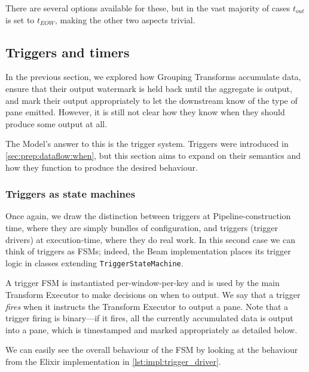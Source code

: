 There are several options available for these, but in the vast majority of cases $t_{\mathit{out}}$ is set to $t_{\mathit{EOW}}$, making the other two aspects trivial.

\subsection{Triggers and timers}\label{sec:impl:dataflow:triggers-timers}

In the previous section, we explored how Grouping Transforms accumulate data, ensure that their output watermark is held back until the aggregate is output, and mark their output appropriately to let the downstream know of the type of pane emitted.
However, it is still not clear how they know when they should produce some output at all.

The Model's answer to this is the trigger system.
Triggers were introduced in \cref{sec:prep:dataflow:when}, but this section aims to expand on their semantics and how they function to produce the desired behaviour.


\subsubsection{Triggers as state machines}
Once again, we draw the distinction between triggers at Pipeline-construction time, where they are simply bundles of configuration, and triggers (trigger drivers) at execution-time, where they do real work.
In this second case we can think of triggers as FSMs; indeed, the Beam implementation places its trigger logic in classes extending \verb|TriggerStateMachine|.

A trigger FSM is instantiated per-window-per-key and is used by the main Transform Executor to make decisions on when to output.
We say that a trigger \emph{fires} when it instructs the Transform Executor to output a pane.
Note that a trigger firing is binary---if it fires, all the currently accumulated data is output into a pane, which is timestamped and marked appropriately as detailed below.

We can easily see the overall behaviour of the FSM by looking at the  behaviour from the Elixir implementation in \cref{lst:impl:trigger_driver}.

